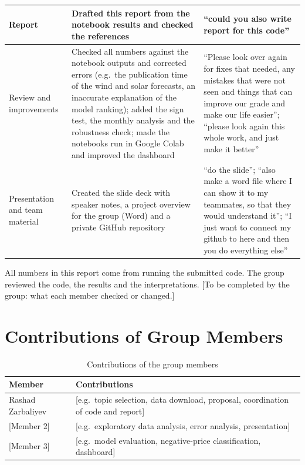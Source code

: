 \documentclass[12pt,oneside]{article}
\begin{document}
{\begin{longtable}{@{}>{\raggedright\arraybackslash}p{}>{\raggedright\arraybackslash}p{}>{\raggedright\arraybackslash}p{}@{}}
        \midrule
        Report & Drafted this report from the notebook results and checked the references & \enquote{could you also write report for this code} \\
        \midrule
        Review and improvements & Checked all numbers against the notebook outputs and corrected errors (e.g.\ the publication time of the wind and solar forecasts, an inaccurate explanation of the model ranking); added the sign test, the monthly analysis and the robustness check; made the notebooks run in Google Colab and improved the dashboard & \enquote{Please look over again for fixes that needed, any mistakes that were not seen and things that can improve our grade and make our life easier}; \enquote{please look again this whole work, and just make it better} \\
        \midrule
        Presentation and team material & Created the slide deck with speaker notes, a project overview for the group (Word) and a private GitHub repository & \enquote{do the slide}; \enquote{also make a word file where I can show it to my teammates, so that they would understand it}; \enquote{I just want to connect my github to here and then you do everything else} \\
\end{longtable}
}

All numbers in this report come from running the submitted code. The group reviewed the code, the results and the interpretations. [To be completed by the group: what each member checked or changed.]

\section{Contributions of Group Members} \label{sec:contrib}

\begin{table}[!htbp]
    \centering
    \caption{Contributions of the group members}
    \begin{tabularx}{\textwidth}{lX}
        \toprule
        Member & Contributions \\
        \midrule
        Rashad Zarbaliyev & [e.g.\ topic selection, data download, proposal, coordination of code and report] \\
        {[Member 2]} & [e.g.\ exploratory data analysis, error analysis, presentation] \\
        {[Member 3]} & [e.g.\ model evaluation, negative-price classification, dashboard] \\
        \bottomrule
    \end{tabularx}
    \label{tab:contrib}
\end{table}
\end{document}
